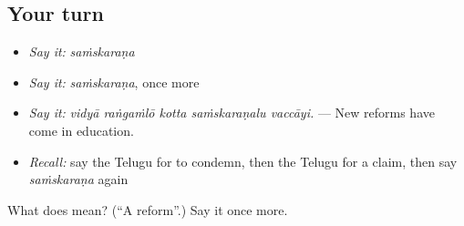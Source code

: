 \subsection*{Your turn}
\begin{itemize}
\raggedright
  \item \emph{Say it:} \emph{saṁskaraṇa}
  \item \emph{Say it:} \emph{saṁskaraṇa}, once more
  \item \emph{Say it:} \emph{vidyā raṅgaṁlō kotta saṁskaraṇalu vaccāyi.} — New reforms have come in education.
  \item \emph{Recall:} say the Telugu for to condemn, then the Telugu for a claim, then say \emph{saṁskaraṇa} again
\end{itemize}

\begin{tcolorbox}[breakable,colback=teal!4,colframe=teal!35!black,title={Before you move on}]
What does  mean? (\textquotedblleft{}A reform\textquotedblright{}.) Say it once more.
\end{tcolorbox}
